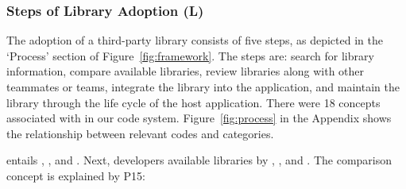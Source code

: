 


\subsubsection{Steps of Library Adoption (L)}\label{sec:phases} 


The adoption of a third-party library consists of five steps, as depicted in the `Process' section of Figure~\ref{fig:framework}. The steps are: search for library information, compare available libraries, review libraries along with other teammates or teams, integrate the library into the application, and maintain the library through the life cycle of the host application. There were 18 concepts associated with  in our code system. Figure~\ref{fig:process} in the Appendix shows the relationship between relevant codes and categories.

 entails , , and . Next, developers  available libraries by , , and . The comparison concept is explained by P15:

